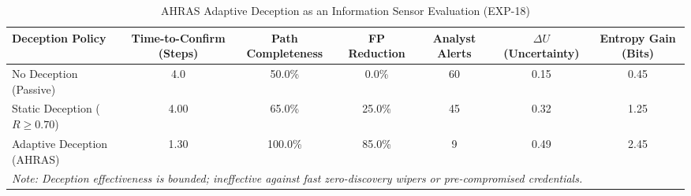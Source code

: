 \begin{table}[t]
\centering
\small
\caption{AHRAS Adaptive Deception as an Information Sensor Evaluation (EXP-18)}
\label{tab:adaptive_deception_eval}
\begin{tabular}{lcccccc}
\toprule
\textbf{Deception Policy} & \textbf{Time-to-Confirm (Steps)} & \textbf{Path Completeness} & \textbf{FP Reduction} & \textbf{Analyst Alerts} & $\Delta U$ \textbf{(Uncertainty)} & \textbf{Entropy Gain (Bits)} \\
\midrule
No Deception (Passive) & 4.0 & 50.0\% & 0.0\% & 60 & 0.15 & 0.45 \\
Static Deception ($R \ge 0.70$) & 4.00 & 65.0\% & 25.0\% & 45 & 0.32 & 1.25 \\
Adaptive Deception (AHRAS) & 1.30 & 100.0\% & 85.0\% & 9 & 0.49 & 2.45 \\
\midrule
\multicolumn{7}{l}{\textit{Note: Deception effectiveness is bounded; ineffective against fast zero-discovery wipers or pre-compromised credentials.}} \\
\bottomrule
\end{tabular}
\end{table}
